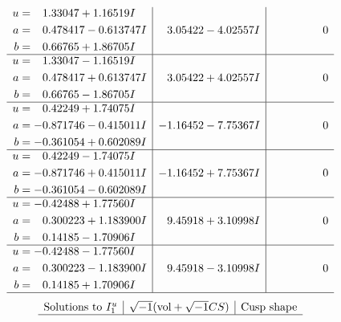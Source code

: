 \documentclass[1p]{elsarticle_modified}
\theoremstyle{definition}
\newcommand{\I}{\sqrt{-1}}
\begin{document}
$$\begin{array}{c|c|c}
\begin{aligned}
u &= \phantom{-}1.33047 + 1.16519 I \\
a &= \phantom{-}0.478417 - 0.613747 I \\
b &= \phantom{-}0.66765 + 1.86705 I\end{aligned}
 & \phantom{-}3.05422 - 4.02557 I & \phantom{-0.000000 } 0 \\ \hline\begin{aligned}
u &= \phantom{-}1.33047 - 1.16519 I \\
a &= \phantom{-}0.478417 + 0.613747 I \\
b &= \phantom{-}0.66765 - 1.86705 I\end{aligned}
 & \phantom{-}3.05422 + 4.02557 I & \phantom{-0.000000 } 0 \\ \hline\begin{aligned}
u &= \phantom{-}0.42249 + 1.74075 I \\
a &= -0.871746 - 0.415011 I \\
b &= -0.361054 + 0.602089 I\end{aligned}
 & -1.16452 - 7.75367 I & \phantom{-0.000000 } 0 \\ \hline\begin{aligned}
u &= \phantom{-}0.42249 - 1.74075 I \\
a &= -0.871746 + 0.415011 I \\
b &= -0.361054 - 0.602089 I\end{aligned}
 & -1.16452 + 7.75367 I & \phantom{-0.000000 } 0 \\ \hline\begin{aligned}
u &= -0.42488 + 1.77560 I \\
a &= \phantom{-}0.300223 + 1.183900 I \\
b &= \phantom{-}0.14185 - 1.70906 I\end{aligned}
 & \phantom{-}9.45918 + 3.10998 I & \phantom{-0.000000 } 0 \\ \hline\begin{aligned}
u &= -0.42488 - 1.77560 I \\
a &= \phantom{-}0.300223 - 1.183900 I \\
b &= \phantom{-}0.14185 + 1.70906 I\end{aligned}
 & \phantom{-}9.45918 - 3.10998 I & \phantom{-0.000000 } 0\\
 \hline 
 \end{array}$$\newpage$$\begin{array}{c|c|c}  
\text{Solutions to }I^u_{1}& \I (\text{vol} + \sqrt{-1}CS) & \text{Cusp shape}\\
 \hline 

\end{array}$$
\end{document}
